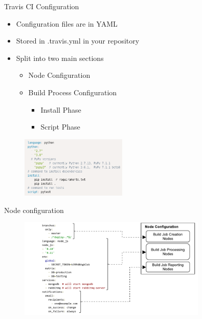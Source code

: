 \documentclass[aspectratio=169,xcolor=dvipsnames]{beamer}
\begin{document}
\begin{frame}{Travis CI Configuration}
    \begin{itemize}
        \item Configuration files are in YAML
        \item Stored in .travis.yml in your repository
        \item Split into two main sections
        \begin{itemize}
            \item Node Configuration
            \item Build Process Configuration 
            \begin{itemize}
                \item Install Phase
                \item Script Phase
            \end{itemize}
        \end{itemize}
    \end{itemize}
    \begin{figure}
        \centering
        \includegraphics[width=0.45\textwidth]{images/Screenshot_20210212_211355.png}
        \label{fig:my_label}
    \end{figure}
\end{frame}

\begin{frame}{Node configuration}
    \begin{figure}
        \centering
        \includegraphics[width=0.8\textwidth]{images/Node Configuration.png}
        \label{fig:my_label}
    \end{figure}
\end{frame}
\end{document}
